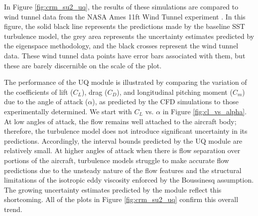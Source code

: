 In Figure \ref{fig:crm_su2_uq}, the results of these simulations are compared to wind tunnel data from the NASA Ames 11ft Wind Tunnel experiment \cite{rivers_experimental_2010}.
In this figure, the solid black line represents the predictions made by the baseline SST turbulence model, the grey area represents the uncertainty estimates predicted by the eigenspace methodology, and the black crosses represent the wind tunnel data.
These wind tunnel data points have error bars associated with them, but these are barely discernible on the scale of the plot. 

The performance of the UQ module is illustrated by comparing the variation of the coefficients of lift ($C_L$), drag ($C_D$), and longitudinal pitching moment ($C_m$) due to the angle of attack ($\alpha$), as predicted by the CFD simulations to those experimentally determined.
We start with $C_L$ vs. $\alpha$ in Figure \ref{fig:cl_vs_alpha}.
At low angles of attack, the flow remains well attached to the aircraft body; therefore, the turbulence model does not introduce significant uncertainty in its predictions.
Accordingly, the interval bounds predicted by the UQ module are relatively small.
At higher angles of attack when there is flow separation over portions of the aircraft, turbulence models struggle to make accurate flow predictions due to the unsteady nature of the flow features and the structural limitations of the isotropic eddy viscosity enforced by the Boussinesq assumption.
The growing uncertainty estimates predicted by the module reflect this shortcoming.
All of the plots in Figure \ref{fig:crm_su2_uq} confirm this overall trend.


